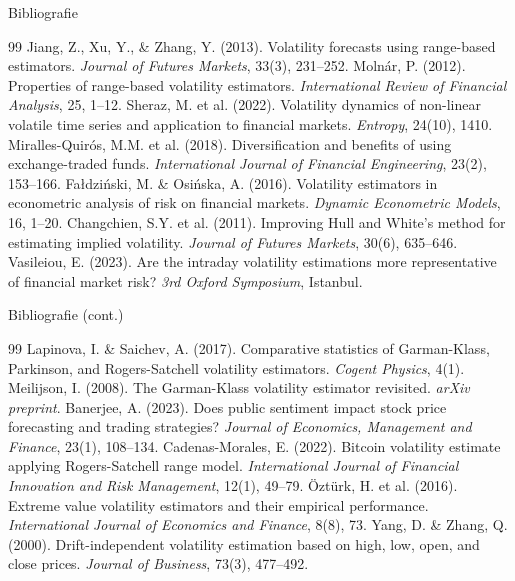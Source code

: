\documentclass[9pt, aspectratio=169, t]{beamer}
\theoremstyle{definition}
\begin{document}
\begin{frame}{Bibliografie}
{\scriptsize
\begin{thebibliography}{99}
 Jiang, Z., Xu, Y., \& Zhang, Y. (2013). Volatility forecasts using range-based estimators. \textit{Journal of Futures Markets}, 33(3), 231--252.
 Moln\'{a}r, P. (2012). Properties of range-based volatility estimators. \textit{International Review of Financial Analysis}, 25, 1--12.
 Sheraz, M. et al. (2022). Volatility dynamics of non-linear volatile time series and application to financial markets. \textit{Entropy}, 24(10), 1410.
 Miralles-Quir\'{o}s, M.M. et al. (2018). Diversification and benefits of using exchange-traded funds. \textit{International Journal of Financial Engineering}, 23(2), 153--166.
 Fa{\l}dzi\'{n}ski, M. \& Osi\'{n}ska, A. (2016). Volatility estimators in econometric analysis of risk on financial markets. \textit{Dynamic Econometric Models}, 16, 1--20.
 Changchien, S.Y. et al. (2011). Improving Hull and White's method for estimating implied volatility. \textit{Journal of Futures Markets}, 30(6), 635--646.
 Vasileiou, E. (2023). Are the intraday volatility estimations more representative of financial market risk? \textit{3rd Oxford Symposium}, Istanbul.
\end{thebibliography}
}
\end{frame}

\begin{frame}{Bibliografie (cont.)}
{\scriptsize
\begin{thebibliography}{99}
 Lapinova, I. \& Saichev, A. (2017). Comparative statistics of Garman-Klass, Parkinson, and Rogers-Satchell volatility estimators. \textit{Cogent Physics}, 4(1).
 Meilijson, I. (2008). The Garman-Klass volatility estimator revisited. \textit{arXiv preprint}.
 Banerjee, A. (2023). Does public sentiment impact stock price forecasting and trading strategies? \textit{Journal of Economics, Management and Finance}, 23(1), 108--134.
 Cadenas-Morales, E. (2022). Bitcoin volatility estimate applying Rogers-Satchell range model. \textit{International Journal of Financial Innovation and Risk Management}, 12(1), 49--79.
 \"{O}zt\"{u}rk, H. et al. (2016). Extreme value volatility estimators and their empirical performance. \textit{International Journal of Economics and Finance}, 8(8), 73.
 Yang, D. \& Zhang, Q. (2000). Drift-independent volatility estimation based on high, low, open, and close prices. \textit{Journal of Business}, 73(3), 477--492.
\end{thebibliography}
}
\end{frame}
\end{document}
